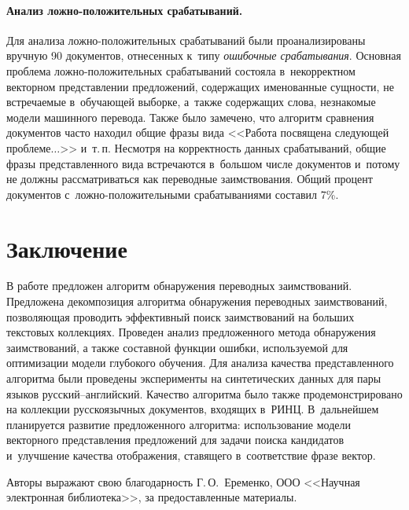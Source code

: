 \begin{multicols}{2}
\paragraph*{Анализ лож\-но-по\-ло\-жи\-тель\-ных срабатываний.}
Для анализа лож\-но-по\-ло\-жи\-тель\-ных срабатываний были проанализированы вручную 90 
документов, отнесенных к~типу \textit{ошибочные срабатывания}.
\mbox{Основная} проблема лож\-но-по\-ло\-жи\-тель\-ных срабатываний со\-сто\-яла в~некорректном 
векторном представлении предложений, содержащих именованные сущ\-ности, не 
встре\-ча\-емые в~обуча\-ющей \mbox{выборке}, а~также содержащих слова, незнакомые модели 
машинного перевода. Также было замечено, что алгоритм сравнения документов час\-то 
находил общие фразы вида <<Работа посвящена сле\-ду\-ющей проб\-ле\-ме$\ldots$>> и~т.\,п. 
Несмотря на корректность данных срабатываний, общие фразы представленного вида 
встречаются в~большом числе документов и~потому не долж\-ны рассматриваться как 
переводные заимствования.
Общий процент документов с~ложно-положительными срабатываниями составил 7\%.

\section{Заключение}

В работе предложен алгоритм обнаружения переводных заимствований. Предложена 
декомпозиция алгоритма обнаружения переводных заимствований, позволяющая 
проводить эффективный поиск заимствований на больших текстовых коллекциях. 
Проведен анализ предложенного метода обнаружения заимствований, а также 
составной функции ошибки, используемой для оптимизации модели глубокого 
обучения.  Для анализа качества представленного алгоритма были проведены 
эксперименты на синтетических данных для пары языков рус\-ский--анг\-лий\-ский. 
Качество алгоритма было также продемонстрировано на коллекции русскоязычных 
документов, входящих в~РИНЦ.
В~дальнейшем планируется развитие предложенного алгоритма: использование модели 
векторного представления предложений для задачи поиска кандидатов и~улучшение 
качества отображения, ставящего в~соответствие фразе вектор.\\

\bigskip

Авторы выражают свою благодарность Г.\,О.~Еременко, ООО <<Научная электронная 
библиотека>>, за предоставленные материалы.

{\small\frenchspacing
{%
\begin{thebibliography}{99}


\end{thebibliography}}}
\end{multicols}
